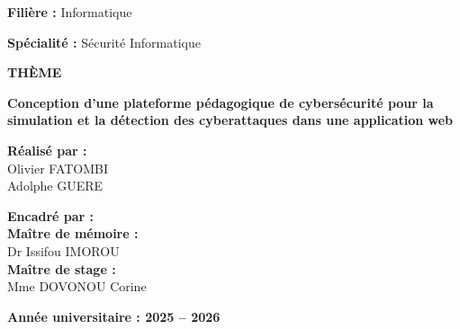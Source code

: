 \documentclass[a4paper,12pt]{report}
\begin{document}
\begin{titlepage}
\begin{center}
            \begin{minipage}{0.45\textwidth}
                \raggedright
                \textbf{Filière :} Informatique
            \end{minipage}
            \hfill
            \begin{minipage}{0.45\textwidth}
                \raggedleft
                \textbf{Spécialité :} Sécurité Informatique
            \end{minipage}
            
            \vspace{1cm}
            
            {\bfseries THÈME}
            
            \vspace{0.4cm}
            
            \begin{mdframed}[backgroundcolor=blue!20, roundcorner=5pt, innertopmargin=0.4cm, innerbottommargin=0.4cm]
                \centering
                \small\bfseries
                Conception d’une plateforme pédagogique de cybersécurité pour la simulation et la détection des cyberattaques dans une application web
            \end{mdframed}
            
            \vspace{1cm}
            
            \begin{minipage}{0.45\textwidth}
                \centering
                \textbf{Réalisé par :}\\[0.2cm]
                Olivier FATOMBI\\
                Adolphe GUERE
            \end{minipage}
            \hfill
            \begin{minipage}{0.45\textwidth}
                \centering
                \textbf{Encadré par :}\\[0.2cm]
                \textbf{Maître de mémoire :}\\
                Dr Issifou IMOROU\\[0.3cm]
                \textbf{Maître de stage :}\\
                Mme DOVONOU Corine
            \end{minipage}
            
            \vfill
            
            {\bfseries Année universitaire : 2025 -- 2026}
            
        \end{center}
        
    \end{titlepage}
    
\end{document}

